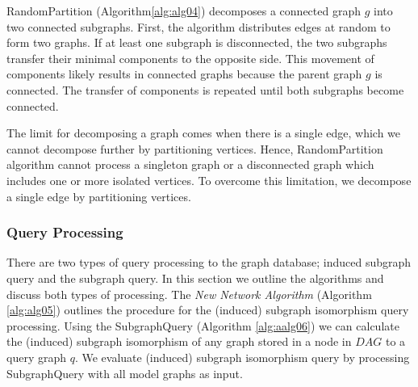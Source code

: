 RandomPartition (Algorithm\ref{alg:alg04}) decomposes a connected graph $g$ into two connected subgraphs.
First, the algorithm distributes edges at random to form two graphs. If at least one subgraph is disconnected, the two subgraphs transfer their minimal components to the opposite side. 
This movement of components likely results in connected graphs because the parent graph $g$ is connected.
The transfer of components is repeated until both subgraphs become connected. 

The limit for decomposing a graph comes when there is a single edge, which we cannot decompose further by partitioning vertices. 
Hence, RandomPartition algorithm cannot process a singleton graph or a disconnected graph which includes one or more isolated vertices. 
To overcome this limitation, we decompose a single edge by partitioning vertices.


\subsubsection{Query Processing}
There are two types of query processing to the graph database; induced subgraph query and the subgraph query. 
In this section we outline the algorithms and discuss both types of processing.
The \textit{New Network Algorithm} (Algorithm \ref{alg:alg05}) outlines the procedure for the (induced) subgraph isomorphism query processing.
Using the SubgraphQuery (Algorithm \ref{alg:aalg06}) we can calculate the (induced) subgraph isomorphism of any graph stored in a node in $DAG$ to a query graph $q$.
We evaluate (induced) subgraph isomorphism query by processing SubgraphQuery with all model graphs as input.

